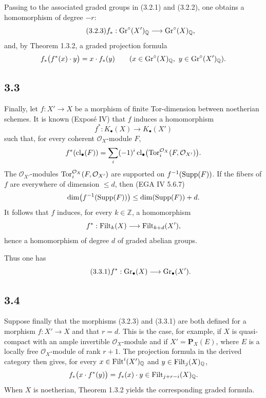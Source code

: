 Passing to the associated graded groups in (3.2.1) and (3.2.2), one obtains a
homomorphism of degree $-r$:
\begin{equation}\tag{3.2.3}
f_*:\operatorname{Gr}^{\circ}(X')_{\mathbb Q}\longrightarrow\operatorname{Gr}^{\circ}(X)_{\mathbb Q},
\end{equation}
and, by Theorem 1.3.2, a graded projection formula
\[
f_*\bigl(f^*(x)\cdot y\bigr)=x\cdot f_*(y)
\qquad(x\in\operatorname{Gr}^{\circ}(X)_{\mathbb Q},\ y\in\operatorname{Gr}^{\circ}(X')_{\mathbb Q}).
\]

\subsection*{3.3}
Finally, let $f:X'\to X$ be a morphism of finite Tor-dimension between
noetherian schemes. It is known (Expos\'e IV) that $f$ induces a homomorphism
\[
f^*:K_\bullet(X)\longrightarrow K_\bullet(X')
\]
such that, for every coherent $\mathcal O_X$-module $F$,
\[
f^*(\operatorname{cl}_\bullet(F))=
\sum_i(-1)^i\operatorname{cl}_\bullet\bigl(
\operatorname{Tor}_i^{\mathcal O_X}(F,\mathcal O_{X'})\bigr).
\]
The $\mathcal O_{X'}$-modules
$\operatorname{Tor}_i^{\mathcal O_X}(F,\mathcal O_{X'})$ are supported on
$f^{-1}(\operatorname{Supp}(F))$. If the fibers of $f$ are everywhere of dimension
$\leq d$, then (EGA IV 5.6.7)
\[
\dim\bigl(f^{-1}(\operatorname{Supp}(F))\bigr)\leq\dim(\operatorname{Supp}(F))+d.
\]
It follows that $f$ induces, for every $k\in\mathbb Z$, a homomorphism
\[
f^*:\operatorname{Filt}_k(X)\longrightarrow\operatorname{Filt}_{k+d}(X'),
\]
hence a homomorphism of degree $d$ of graded abelian groups.

Thus one has
\begin{equation}\tag{3.3.1}
f^*:\operatorname{Gr}_{\bullet}(X)\longrightarrow\operatorname{Gr}_{\bullet}(X').
\end{equation}

\subsection*{3.4}
Suppose finally that the morphisms (3.2.3) and (3.3.1) are both defined for a
morphism $f:X'\to X$ and that $r=d$. This is the case, for example, if $X$
is quasi-compact with an ample invertible $\mathcal O_X$-module and if
$X'=\mathbf P_X(E)$, where $E$ is a locally free $\mathcal O_X$-module of
rank $r+1$. The projection formula in the derived category then gives, for
every $x\in\operatorname{Filt}^i(X')_{\mathbb Q}$ and $y\in\operatorname{Filt}_j(X)_{\mathbb Q}$,
\[
f_*\bigl(x\cdot f^*(y)\bigr)=f_*(x)\cdot y
\in\operatorname{Filt}_{j+r-i}(X)_{\mathbb Q}.
\]
When $X$ is noetherian, Theorem 1.3.2 yields the corresponding graded formula.


